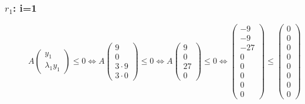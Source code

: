 	\subsubsection{$r_1$: i=1}
	\begin{figure}[H]
		\centering
		$A\begin{pmatrix} y_1 \\ \lambda_1y_1 \end{pmatrix} \le 0 \Leftrightarrow A\begin{pmatrix} 9 \\ 0 \\ 3\cdot 9 \\ 3\cdot 0 \end{pmatrix} \le 0 \Leftrightarrow A\begin{pmatrix} 9 \\ 0 \\ 27 \\ 0 \end{pmatrix} \le 0 \Leftrightarrow \begin{pmatrix} -9 \\ -9 \\ -27 \\ 0 \\ 0 \\ 0 \\ 0 \\ 0 \end{pmatrix} \le \begin{pmatrix} 0 \\ 0 \\ 0 \\ 0 \\ 0 \\ 0 \\ 0 \\ 0 \end{pmatrix}$
	\end{figure}
	
